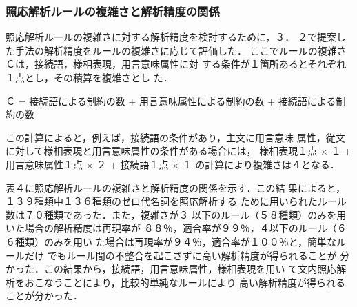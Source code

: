 \subsubsection{照応解析ルールの複雑さと解析精度の関係}

照応解析ルールの複雑さに対する解析精度を検討するために，３．
２で提案した手法の解析精度をルールの複雑さに応じて評価した．
ここでルールの複雑さＣは，接続語，様相表現，用言意味属性に対
する条件が１箇所あるとそれぞれ１点とし，その積算を複雑さとし
た．

\noindent
Ｃ = 接続語による制約の数 + 用言意味属性による制約の数 + 接続語による制約の数 

\noindent
この計算によると，例えば，接続語の条件があり，主文に用言意味
属性，従文に対して様相表現と用言意味属性の条件がある場合には，
様相表現１点 \( \times \) １ + 用言意味属性１点 \( \times \)  ２ + 
接続語１点 \( \times \) １ の計算により複雑さは４となる．

表４に照応解析ルールの複雑さと解析精度の関係を示す．この結
果によると，１３９種類中１３６種類のゼロ代名詞を照応解析する
ために用いられたルール数は７０種類であった．また，複雑さが３
以下のルール（５８種類）のみを用いた場合の解析精度は再現率が
８８％，適合率が９９％，４以下のルール（６６種類）のみを用い
た場合は再現率が９４％，適合率が１００％と，簡単なルールだけ
でもルール間の不整合を起こさずに高い解析精度が得られることが
分かった．この結果から，接続語，用言意味属性，様相表現を用い
て文内照応解析をおこなうことにより，比較的単純なルールにより
高い解析精度が得られることが分かった．

